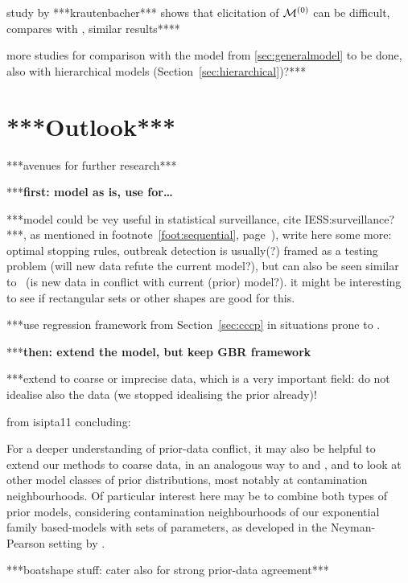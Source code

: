 study by ***krautenbacher*** shows that elicitation of $\mathcal{M}^{(0)}$ can be difficult,
compares with \textcite{2005:whitcomb}, similar results****

more studies for comparison with the model from \ref{sec:generalmodel} to be done,
also with hierarchical models (Section~\ref{sec:hierarchical})?***







\section{***Outlook***}

***avenues for further research***

***\textbf{first: model as is, use for\dots }

***model could be vey useful in statistical surveillance, cite IESS:surveillance?***,
as mentioned in footnote~\ref{foot:sequential}, page~\pageref{foot:sequential}),
write here some more: optimal stopping rules, outbreak detection is usually(?)
framed as a testing problem (will new data refute the current model?),
but can also be seen similar to \pdc\ (is new data in conflict with current (prior) model?).
it might be interesting to see if rectangular sets or other shapes are good for this.  

***use regression framework from Section~\ref{sec:cccp} in situations prone to \pdc.


***\textbf{then: extend the model, but keep GBR framework}

***extend to coarse or imprecise data, which is a very important field:
do not idealise also the data (we stopped idealising the prior already)!

from isipta11 concluding:
\begin{small}
For a deeper understanding of prior-data conflict, it may also be helpful
to extend our methods to coarse data, in an analogous way to \textcite{2007:utkinaugustin} and
\textcite{2009:Troffaes:Coolen}, and to look at other model classes of prior distributions, most
notably at contamination neighbourhoods. Of particular interest here may
be to combine both types of prior models, considering contamination
neighbourhoods of our exponential family based-models with sets of
parameters, as developed in the Neyman-Pearson setting by
\textcite[\S~5]{2002:augustin}.
\end{small}


***boatshape stuff: cater also for strong prior-data agreement***


